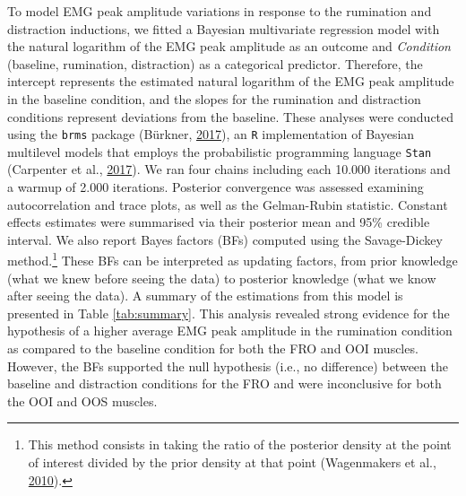 \documentclass[
  english,
  man, donotrepeattitle,floatsintext]{apa6}
\begin{document}
To model EMG peak amplitude variations in response to the rumination and distraction inductions, we fitted a Bayesian multivariate regression model with the natural logarithm of the EMG peak amplitude as an outcome and \emph{Condition} (baseline, rumination, distraction) as a categorical predictor. Therefore, the intercept represents the estimated natural logarithm of the EMG peak amplitude in the baseline condition, and the slopes for the rumination and distraction conditions represent deviations from the baseline. These analyses were conducted using the \texttt{brms} package (Bürkner, \protect\hyperlink{ref-R-brms}{2017}), an \texttt{R} implementation of Bayesian multilevel models that employs the probabilistic programming language \texttt{Stan} (Carpenter et al., \protect\hyperlink{ref-carpenter_stan_2017}{2017}). We ran four chains including each 10.000 iterations and a warmup of 2.000 iterations. Posterior convergence was assessed examining autocorrelation and trace plots, as well as the Gelman-Rubin statistic. Constant effects estimates were summarised via their posterior mean and 95\% credible interval. We also report Bayes factors (BFs) computed using the Savage-Dickey method.\footnote{This method consists in taking the ratio of the posterior density at the point of interest divided by the prior density at that point (Wagenmakers et al., \protect\hyperlink{ref-wagenmakers_bayesian_2010}{2010}).} These BFs can be interpreted as updating factors, from prior knowledge (what we knew before seeing the data) to posterior knowledge (what we know after seeing the data). A summary of the estimations from this model is presented in Table \ref{tab:summary}. This analysis revealed strong evidence for the hypothesis of a higher average EMG peak amplitude in the rumination condition as compared to the baseline condition for both the FRO and OOI muscles. However, the BFs supported the null hypothesis (i.e., no difference) between the baseline and distraction conditions for the FRO and were inconclusive for both the OOI and OOS muscles.
\end{document}
